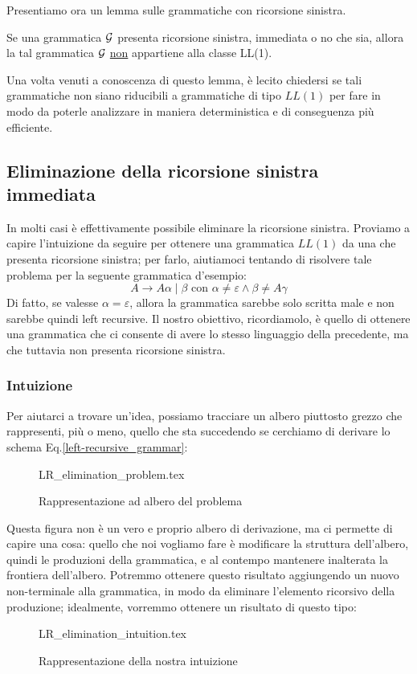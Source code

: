 \documentclass[class=book, crop=false, oneside, 12pt]{standalone}
\begin{document}
Presentiamo ora un lemma sulle grammatiche con ricorsione sinistra.
\begin{lemma}\label{ll1-leftrec}
    Se una grammatica \(\mathcal{G}\) presenta ricorsione sinistra, immediata o no che sia, allora la tal grammatica \(\mathcal{G}\) \underline{non} appartiene alla classe LL(1).
\end{lemma}
Una volta venuti a conoscenza di questo lemma, è lecito chiedersi se tali grammatiche non siano riducibili a grammatiche di tipo \(LL(1)\) per fare in modo da poterle analizzare in maniera deterministica e di conseguenza più efficiente.

\subsection{Eliminazione della ricorsione sinistra immediata}
In molti casi è effettivamente possibile eliminare la ricorsione sinistra. 
Proviamo a capire l'intuizione da seguire per ottenere una grammatica \(LL(1)\) da una che presenta ricorsione sinistra; per farlo, aiutiamoci tentando di risolvere tale problema per la seguente grammatica d'esempio:
\begin{equation}
    \label{left-recursive_grammar}
    A \to A \alpha \mid \beta \textrm{  con  } \alpha \neq \varepsilon \land \beta \neq A \gamma
\end{equation}
Di fatto, se valesse \(\alpha = \varepsilon\), allora la grammatica sarebbe solo scritta male e non sarebbe quindi left recursive. Il nostro obiettivo, ricordiamolo, è quello di ottenere una grammatica che ci consente di avere lo stesso linguaggio della precedente, ma che tuttavia non presenta ricorsione sinistra. 

\subsubsection{Intuizione}
Per aiutarci a trovare un'idea, possiamo tracciare un albero piuttosto grezzo che rappresenti, più o meno, quello che sta succedendo se cerchiamo di derivare lo schema Eq.\ref{left-recursive_grammar}:
\begin{figure}[H]
    \centering
    {LR_elimination_problem.tex}
    \caption{Rappresentazione ad albero del problema}
    \label{lrremove-intuition_1}
\end{figure}
Questa figura non è un vero e proprio albero di derivazione, ma ci permette di capire una cosa: quello che noi vogliamo fare è modificare la struttura dell'albero, quindi le produzioni della grammatica, e al contempo mantenere inalterata la frontiera dell'albero. Potremmo ottenere questo risultato aggiungendo un nuovo non-terminale alla grammatica, in modo da eliminare l'elemento ricorsivo della produzione; idealmente, vorremmo ottenere un risultato di questo tipo:
\begin{figure}[H]
    \centering
    {LR_elimination_intuition.tex}
    \caption{Rappresentazione della nostra intuizione}
    \label{lrremove-intuition_2}
\end{figure}
\end{document}
